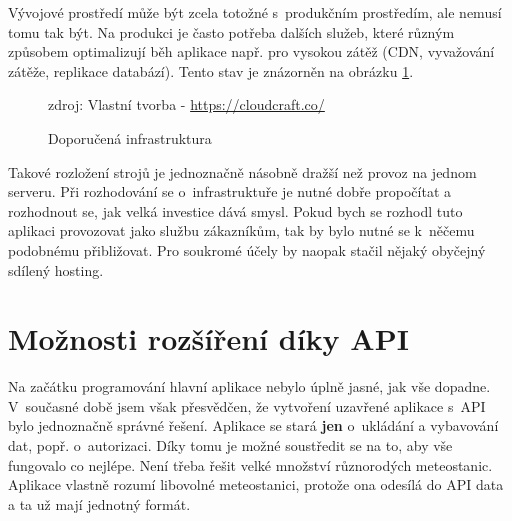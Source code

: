 Vývojové prostředí může být zcela totožné s~produkčním prostředím, ale nemusí tomu tak být. Na produkci je často potřeba dalších služeb, které různým způsobem optimalizují běh aplikace např. pro vysokou zátěž (CDN, vyvažování zátěže, replikace databází). Tento stav je znázorněn na obrázku \ref{fig:infrastructure}.

\begin{figure}[h]
	\centering
	\caption{Doporučená infrastruktura}
	\small zdroj: Vlastní tvorba - \url{https://cloudcraft.co/}
	\label{fig:infrastructure}
\end{figure}

Takové rozložení strojů je jednoznačně násobně dražší než provoz na jednom serveru. Při rozhodování se o~infrastruktuře je nutné dobře propočítat a rozhodnout se, jak velká investice dává smysl. Pokud bych se rozhodl tuto aplikaci provozovat jako službu zákazníkům, tak by bylo nutné se k~něčemu podobnému přibližovat. Pro soukromé účely by naopak stačil nějaký obyčejný sdílený hosting.


\section{Možnosti rozšíření díky API}
Na začátku programování hlavní aplikace nebylo úplně jasné, jak vše dopadne. V~současné době jsem však přesvědčen, že vytvoření uzavřené aplikace s~API bylo jednoznačně správné řešení. Aplikace se stará \textbf{jen} o~ukládání a vybavování dat, popř. o~autorizaci. Díky tomu je možné soustředit se na to, aby vše fungovalo co nejlépe. Není třeba řešit velké množství různorodých meteostanic. Aplikace vlastně rozumí libovolné meteostanici, protože ona odesílá do API data a ta už mají jednotný formát.

